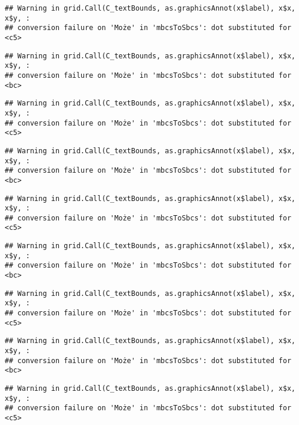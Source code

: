 \documentclass[
]{book}
\begin{document}
\begin{verbatim}
## Warning in grid.Call(C_textBounds, as.graphicsAnnot(x$label), x$x, x$y, :
## conversion failure on 'Może' in 'mbcsToSbcs': dot substituted for <c5>
\end{verbatim}

\begin{verbatim}
## Warning in grid.Call(C_textBounds, as.graphicsAnnot(x$label), x$x, x$y, :
## conversion failure on 'Może' in 'mbcsToSbcs': dot substituted for <bc>
\end{verbatim}

\begin{verbatim}
## Warning in grid.Call(C_textBounds, as.graphicsAnnot(x$label), x$x, x$y, :
## conversion failure on 'Może' in 'mbcsToSbcs': dot substituted for <c5>
\end{verbatim}

\begin{verbatim}
## Warning in grid.Call(C_textBounds, as.graphicsAnnot(x$label), x$x, x$y, :
## conversion failure on 'Może' in 'mbcsToSbcs': dot substituted for <bc>
\end{verbatim}

\begin{verbatim}
## Warning in grid.Call(C_textBounds, as.graphicsAnnot(x$label), x$x, x$y, :
## conversion failure on 'Może' in 'mbcsToSbcs': dot substituted for <c5>
\end{verbatim}

\begin{verbatim}
## Warning in grid.Call(C_textBounds, as.graphicsAnnot(x$label), x$x, x$y, :
## conversion failure on 'Może' in 'mbcsToSbcs': dot substituted for <bc>
\end{verbatim}

\begin{verbatim}
## Warning in grid.Call(C_textBounds, as.graphicsAnnot(x$label), x$x, x$y, :
## conversion failure on 'Może' in 'mbcsToSbcs': dot substituted for <c5>
\end{verbatim}

\begin{verbatim}
## Warning in grid.Call(C_textBounds, as.graphicsAnnot(x$label), x$x, x$y, :
## conversion failure on 'Może' in 'mbcsToSbcs': dot substituted for <bc>
\end{verbatim}

\begin{verbatim}
## Warning in grid.Call(C_textBounds, as.graphicsAnnot(x$label), x$x, x$y, :
## conversion failure on 'Może' in 'mbcsToSbcs': dot substituted for <c5>
\end{verbatim}
\end{document}

